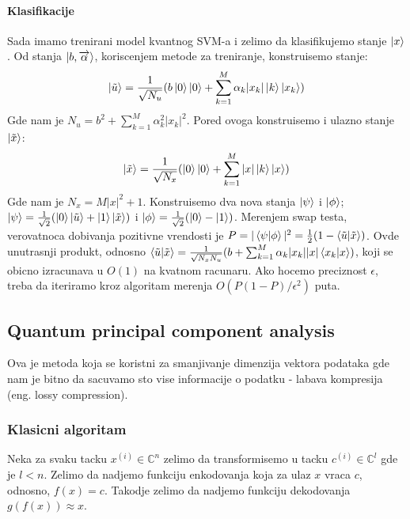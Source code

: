 \documentclass[12pt, letterpaper, oneside]{article}
\begin{document}
\paragraph*{Klasifikacije}
Sada imamo trenirani model kvantnog SVM-a i zelimo da klasifikujemo stanje $\Ket{x}$. Od stanja $\Ket{b,\overrightarrow{\alpha}}$, koriscenjem metode za treniranje, konstruisemo stanje:
\[
    \Ket{\tilde{u}} = \frac{1}{\sqrt{N_u}}(b\Ket{0}\Ket{0} + \sum_{k=1}^M{\alpha_k |x_k| \Ket{k}\Ket{x_k}})
\]
Gde nam je $N_u=b^2+\sum_{k=1}^M{\alpha_k^2 |x_k|^2}$. Pored ovoga konstruisemo i ulazno stanje $\Ket{\tilde{x}}$:
\[
    \Ket{\tilde{x}} = \frac{1}{\sqrt{N_x}}(\Ket{0}\Ket{0} + \sum_{k=1}^M{|x|\Ket{k}\Ket{x}})
\]
Gde nam je $N_x=M|x|^2 + 1$. Konstruisemo dva nova stanja $\Ket{\psi}$ i $\Ket{\phi}$; $\Ket{\psi}=\frac{1}{\sqrt{2}}(\Ket{0}\Ket{\tilde{u}}+\Ket{1}\Ket{\tilde{x}})$ i
$\Ket{\phi} = \frac{1}{\sqrt{2}}(\Ket{0}-\Ket{1})$. Merenjem swap testa, verovatnoca dobivanja pozitivne vrendosti je $P=|\braket{\psi|\phi}|^2=\frac{1}{2}(1-\braket{\tilde{u}|\tilde{x}})$. 
Ovde unutrasnji produkt, odnosno 
$\braket{\tilde{u}|\tilde{x}} = \frac{1}{\sqrt{N_xN_u}}(b+\sum_{k=1}^M{\alpha_k |x_k||x|\braket{x_k|x}})$, koji se obicno izracunava u $O(1)$ na kvatnom racunaru.
Ako hocemo preciznost $\epsilon$, treba da iteriramo kroz algoritam merenja $O(P(1-P)/\epsilon^2)$ puta. \cite{rebentrost2014quantum}
\subsection{Quantum principal component analysis}
Ova je metoda koja se koristni za smanjivanje dimenzija vektora podataka gde nam je bitno da sacuvamo sto vise informacije o podatku -
labava kompresija (eng. lossy compression). 
\subsubsection{Klasicni algoritam}
Neka za svaku tacku $x^{(i)} \in \mathbb{C}^n$ zelimo da transformisemo u tacku $c^{(i)} \in \mathbb{C}^l$ gde je $l < n$.
Zelimo da nadjemo funkciju enkodovanja koja za ulaz $x$ vraca $c$, odnosno, $f(x)=c$. Takodje zelimo da nadjemo funkciju dekodovanja $g(f(x)) \approx x$.
\end{document}
